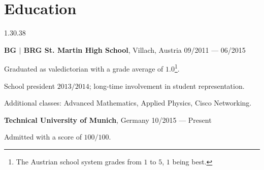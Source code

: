 \section{Education}{1.3}{0.38}
\begin{entry}
	{\textbf{BG $|$ BRG St. Martin High School}, Villach, Austria}{}
	{09/2011 --- 06/2015}
	\item Graduated as valedictorian with a grade average of $1.0$\footnote{The Austrian school system grades from $1$ to $5$, $1$ being best.}.
	\item School president $2013/2014$; long-time involvement in student representation.
	\item Additional classes: Advanced Mathematics, Applied Physics, Cisco Networking.
\end{entry}
\begin{entry}
	{\textbf{Technical University of Munich}, Germany}{}
	{10/2015 --- Present}
	\item Admitted with a score of $100/100$.
\end{entry}


